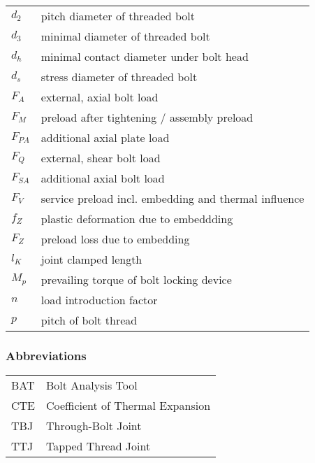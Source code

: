 \begin{longtable}{p{4cm} l}
  $d_2$ & pitch diameter of threaded bolt \\
  $d_3$ & minimal diameter of threaded bolt \\
  $d_h$ & minimal contact diameter under bolt head \\
  $d_s$ & stress diameter of threaded bolt \\
  $F_A$ & external, axial bolt load \\
  $F_M$ & preload after tightening / assembly preload \\
  $F_{PA}$ & additional axial plate load \\
  $F_Q$ & external, shear bolt load \\
  $F_{SA}$ & additional axial bolt load \\
  $F_V$ & service preload incl. embedding and thermal influence \\
  $f_Z$ & plastic deformation due to embeddding \\
  $F_Z$ & preload loss due to embedding \\
  $l_K$ & joint clamped length \\
  $M_p$ & prevailing torque of bolt locking device \\
  $n$ & load introduction factor \\
  $p$ & pitch of bolt thread \\
\end{longtable}

\subsubsection*{Abbreviations}
\begin{tabular}{p{3cm} l}
  BAT & Bolt Analysis Tool \\
  CTE & Coefficient of Thermal Expansion \\
  TBJ & Through-Bolt Joint \\
  TTJ & Tapped Thread Joint \\
\end{tabular}